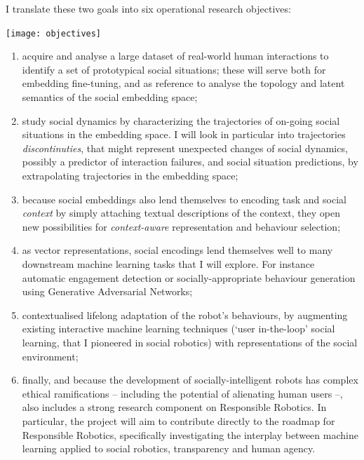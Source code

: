 I translate these two goals into six operational research objectives:

\begin{center}
    \texttt{[image: objectives]}
\end{center}

\begin{enumerate}[label=\textbf{O\arabic*}]
    \item \label{T1} acquire and analyse a large dataset of real-world human
        interactions to identify a set of prototypical
        social situations; these will serve both for embedding fine-tuning, and
        as reference to analyse the topology and latent semantics of the social
        embedding space;

    \item \label{T2} study social dynamics by characterizing the trajectories of
        on-going social situations in the embedding space. I will look in
        particular into trajectories \emph{discontinuties}, that might represent
        unexpected changes of social dynamics, possibly a predictor of
        interaction failures, and social situation predictions, by extrapolating
        trajectories in the embedding space;

    \item \label{T5} because social embeddings also lend themselves to encoding
        task and social \emph{context} by simply attaching textual descriptions
        of the context, they open new possibilities for
        \emph{context-aware} representation and behaviour selection;


    \item \label{T3} as vector representations, social encodings lend
        themselves well to many downstream machine learning tasks
        that I will explore. For instance automatic engagement
        detection or socially-appropriate behaviour generation using Generative
        Adversarial Networks;

    \item \label{T4} contextualised lifelong adaptation of the robot's
        behaviours, by augmenting existing interactive machine learning
        techniques (`user in-the-loop' social learning, that I pioneered in
        social robotics\cite{senft2017supervised,
        winkle2020couch,winkle2021leador}) with representations of the social
        environment;

    \item \label{T6} finally, and because the development of
        socially-intelligent robots has complex ethical ramifications --
        including the potential of alienating human users --, \project also
        includes a strong research component on Responsible Robotics. In
        particular, the project will aim to contribute directly to the roadmap
        for Responsible Robotics, specifically investigating the interplay between
        machine learning applied to social robotics, transparency and human agency.

\end{enumerate}

